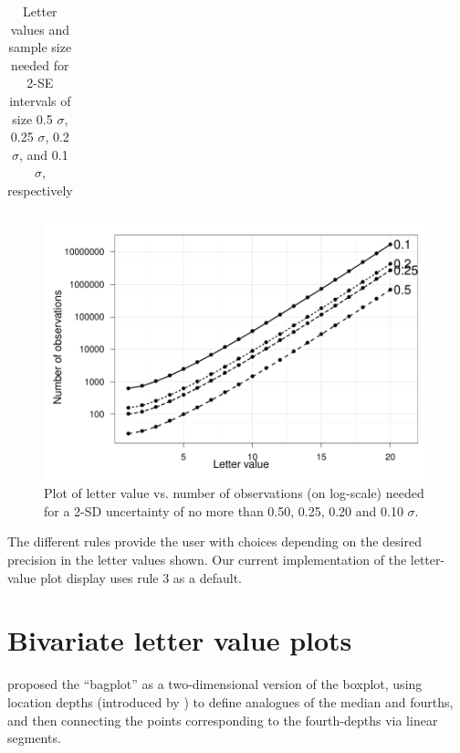 \documentclass[12pt,oneside]{article}
\begin{document}
\begin{table}
\begin{center}
\begin{tabular}{lrrrrr}
  \end{tabular}
  \end{center}
  \caption{Letter values and sample size needed for 2-SE intervals of size 0.5 $\sigma$, 0.25 $\sigma$, 0.2 $\sigma$, and 0.1 $\sigma$, respectively }
  \label{tbl:lv-error}
\end{table}

\begin{figure}[hbtp]
  \centering
  \includegraphics[width=0.5\linewidth]{letter-val-errors}

  \caption{Plot of letter value vs. number of observations (on log-scale) needed for a 2-SD uncertainty of no more than 0.50, 0.25, 0.20 and 0.10 $\sigma$. }
  \label{fig:lv-error} 
\end{figure}

The different rules provide the user with choices depending on the desired precision in the letter values shown. Our current implementation of the letter-value plot display uses rule 3 as a default.

\section{Bivariate letter value plots}
\label{sec:bivariate}

\citet{bagplots} proposed the ``bagplot'' as a two-dimensional version of the boxplot, using location depths (introduced by \citet{tukey75}) to define analogues of the median and fourths, and then connecting the points corresponding to the fourth-depths via linear segments. 
\end{document}
